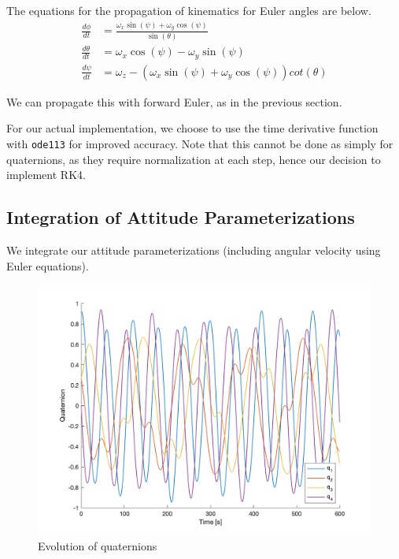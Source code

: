 The equations for the propagation of kinematics for Euler angles are below.
\begin{align*}
\frac{d \phi}{dt} &= \frac{\omega_{x} \sin(\psi) + \omega_{y} \cos(\psi)}{\sin(\theta)}\\
\frac{d \theta}{dt} &= \omega_{x} \cos(\psi) - \omega_{y} \sin(\psi)\\
\frac{d \psi}{dt} &= \omega_{z} - (\omega_{x} \sin(\psi) + \omega_{y} \cos(\psi)) cot(\theta)
\end{align*}


We can propagate this with forward Euler, as in the previous section.



For our actual implementation, we choose to use the time derivative function with \texttt{ode113} for improved accuracy. Note that this cannot be done as simply for quaternions, as they require normalization at each step, hence our decision to implement RK4.

\subsection{Integration of Attitude Parameterizations}
We integrate our attitude parameterizations (including angular velocity using Euler equations).

\begin{figure}[H]
\centering
\includegraphics[scale=0.6]{Images/ps3_problem6_quaternions.png}
\caption{Evolution of quaternions}
\label{fig:ps3_problem6_quaternions}
\end{figure}

